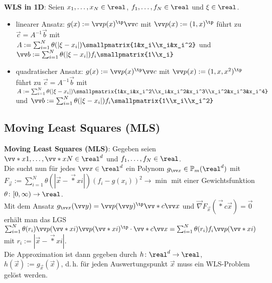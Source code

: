 \textbf{WLS in 1D}:
Seien $x_1, \dotsc, x_N \in \real$, $f_1, \dotsc, f_N \in \real$ und $\xi \in \real$.
\begin{itemize}
    \item
    linearer Ansatz:
    $g(x) := \vec{p}(x)^\tp \vec{c}$ mit $\vec{p}(x) := (1, x)^\tp$
    führt zu $\vec{c} = A^{-1} \vec{b}$ mit\\
    $A := \sum_{i=1}^N \theta(|\xi - x_i|) \smallpmatrix{1&x_i\\x_i&x_i^2}$ und
    $\vec{b} := \sum_{i=1}^N \theta(|\xi - x_i|) f_i \smallpmatrix{1\\x_i}$

    \item
    quadratischer Ansatz:
    $g(x) := \vec{p}(x)^\tp \vec{c}$ mit $\vec{p}(x) := (1, x, x^2)^\tp$
    führt zu $\vec{c} = A^{-1} \vec{b}$ mit\\
    $A := \sum_{i=1}^N \theta(|\xi - x_i|)
    \smallpmatrix{1&x_i&x_i^2\\x_i&x_i^2&x_i^3\\x_i^2&x_i^3&x_i^4}$ und
    $\vec{b} := \sum_{i=1}^N \theta(|\xi - x_i|) f_i \smallpmatrix{1\\x_i\\x_i^2}$
\end{itemize}

\pagebreak

\subsection{%
    Moving Least Squares (MLS)%
}

\textbf{Moving Least Squares (MLS)}:
Gegeben seien $\vec*{x}{1}, \dotsc, \vec*{x}{N} \in \real^d$ und
$f_1, \dotsc, f_N \in \real$.\\
Die  sucht nun für jedes $\vec{x} \in \real^d$
ein Polynom $g_{\vec{x}} \in \PP_m(\real^d)$ mit\\
$F_{\vec{x}} := \sum_{i=1}^N \theta(|\vec{x} - \vec*{x}{i}|) (f_i - g(x_i))^2 \to \min$
mit einer Gewichtsfunktion $\theta\colon [0, \infty) \to \real$.\\
Mit dem Ansatz $g_{\vec{x}}(\vec{y}) = \vec{p}(\vec{y})^\tp \vec*{c}{\vec{x}}$ und
$\vec{\nabla} F_{\vec{x}}(\vec*{c}{\vec{x}}) = \vec{0}$ erhält man das LGS\\
$\sum_{i=1}^N \theta(r_i) \vec{p}(\vec*{x}{i}) \vec{p}(\vec*{x}{i})^\tp \cdot \vec*{c}{\vec{x}}
= \sum_{i=1}^N \theta(r_i) f_i \vec{p}(\vec*{x}{i})$ mit $r_i := |\vec{x} - \vec*{x}{i}|$.\\
Die Approximation ist dann gegeben durch
$h\colon \real^d \to \real$, $h(\vec{x}) := g_{\vec{x}}(\vec{x})$,
d.\,h. für jeden Auswertungspunkt $\vec{x}$ muss ein WLS-Problem gelöst werden.

